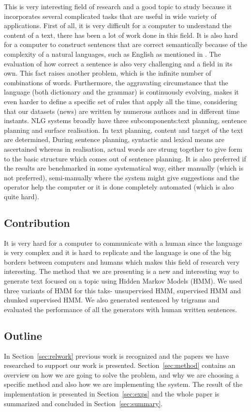 \documentclass[a4paper,12pt]{article}
\begin{document}
This is very interesting field of research and a good topic to study because it
incorporates several complicated tasks that are useful in wide variety of
applications. First of all, it is very difficult for a computer to understand
the content of a text, there has been a lot of work done in this field. 
It is also hard for a computer to construct sentences that are correct
semantically because of the complexity of a natural languages, such as English
as mentioned in \cite{nlgScratch}. The evaluation of how correct a sentence is 
also very challenging and a field in its own. This fact raises another problem, 
which is the infinite number of combinations of words. Furthermore, the 
aggravating circumstance that the language (both dictionary and the grammar)
 is continuously evolving, makes it even harder to define a specific set of rules 
that apply all the time, considering that our datasets (news) are written by numerous authors and in
different time instants. NLG systems broadly have three subcomponents:text
planning, sentence planning and surface realisation.
In text planning, content and target of the text are determined, During sentence
planning, syntactic and lexical means are ascertained whereas in realisation, 
actual words are strung together to give form to the basic structure which comes out
of sentence planning. 
It is also preferred if the results are benchmarked in some systematical way,
either manually (which is not preferred), semi-manually where the system might
give suggestions and the operator help the computer or it is done completely
automated (which is also quite hard).


\subsection{Contribution}
It is very hard for a computer to communicate with a human since the language is
very complex and it is hard to replicate and the language is one of the big
borders between computers and humans which makes this field of research very
interesting. The method that we are presenting is a new and interesting way to
generate text focused on a topic using Hidden Markov Models (HMM). We used
three variants of HMM for this taks- unsupervised HMM, supervised HMM and 
chunked supervised HMM. We also generated sentenced by trigrams and evaluated
the performance of all the generators with human written sentences.

\subsection{Outline}
In Section~\ref{sec:relwork} previous work is recognized and the papers we have
researched to support our work is presented. Section~\ref{sec:method} contains
an overview on how we are going to solve the problem, and why we are choosing a
specific method and also how we are implementing the system. The result of the
implementation is presented in Section~\ref{sec:exps} and the whole paper is
summarized and concluded in Section~\ref{sec:summary}.
\end{document}
